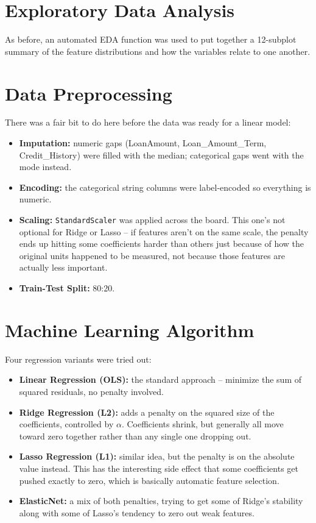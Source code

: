 \documentclass[12pt,a4paper]{article}
\begin{document}
\section{Exploratory Data Analysis}
As before, an automated EDA function was used to put together a 12-subplot summary of the feature distributions and how the variables relate to one another.

\section{Data Preprocessing}
There was a fair bit to do here before the data was ready for a linear model:
\begin{itemize}
    \item \textbf{Imputation:} numeric gaps (LoanAmount, Loan\_Amount\_Term, Credit\_History) were filled with the median; categorical gaps went with the mode instead.
    \item \textbf{Encoding:} the categorical string columns were label-encoded so everything is numeric.
    \item \textbf{Scaling:} \texttt{StandardScaler} was applied across the board. This one's not optional for Ridge or Lasso -- if features aren't on the same scale, the penalty ends up hitting some coefficients harder than others just because of how the original units happened to be measured, not because those features are actually less important.
    \item \textbf{Train-Test Split:} 80:20.
\end{itemize}

\section{Machine Learning Algorithm}
Four regression variants were tried out:
\begin{itemize}
    \item \textbf{Linear Regression (OLS):} the standard approach -- minimize the sum of squared residuals, no penalty involved.
    \item \textbf{Ridge Regression (L2):} adds a penalty on the squared size of the coefficients, controlled by $\alpha$. Coefficients shrink, but generally all move toward zero together rather than any single one dropping out.
    \item \textbf{Lasso Regression (L1):} similar idea, but the penalty is on the absolute value instead. This has the interesting side effect that some coefficients get pushed exactly to zero, which is basically automatic feature selection.
    \item \textbf{ElasticNet:} a mix of both penalties, trying to get some of Ridge's stability along with some of Lasso's tendency to zero out weak features.
\end{itemize}
\end{document}
